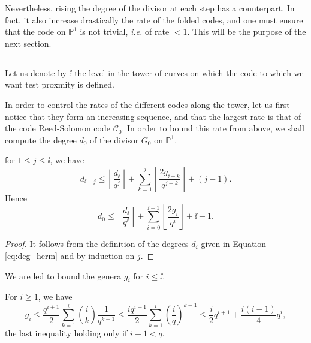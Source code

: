 \documentclass[10pt]{article}
\begin{document}
Nevertheless, rising the degree of the divisor at each step has a counterpart. In fact, it also increase drastically the rate of the folded codes, and one must ensure that the code on $\mathbb{P}^1$ is not trivial, \textit{i.e.} of rate $< 1$. This will be the purpose of the next section. \\



\subsection{}

Let us denote by $\ii$ the level in the tower of curves on which the code to which we want test proxmity is defined.


In order to control the rates of the different codes along the tower, let us first notice that they form an increasing sequence, and that the largest rate is that of the code Reed-Solomon code $\mathcal{C}_0$. In order to bound this rate from above, we shall compute the degree $d_0$ of the divisor $G_0$ on $\mathbb{P}^1$. \\

\begin{lemma}\label{lem:deg_herm}
for $1 \leq j \leq \ii$, we have 
\[d_{\ii -j} \leq \left\lfloor \dfrac{d_{\ii}}{q^j}\right\rfloor + \sum\limits_{k=1}^j \left\lfloor \dfrac{2g_{\ii -k}}{q^{j-k}}\right\rfloor + (j-1).\]
Hence 
\[d_0 \leq \left\lfloor \dfrac{d_{\ii}}{q^{\ii}}\right\rfloor + \sum\limits_{i=0}^{\ii-1} \left\lfloor \dfrac{2g_i}{q^{i}}\right\rfloor + \ii-1.\]

\end{lemma}

\begin{proof}
It follows from the definition of the degrees $d_i$ given in Equation \eqref{eq:deg_herm} and by induction on $j$.
\end{proof}

We are led to bound the genera $g_i$ for $i \leq \ii$. 

\begin{proposition}\label{prop:maj_genus_herm}
For $i \geq 1$, we have
\[g_i \leq \dfrac{q^{i+1}}{2} \sum\limits_{k=1}^i \binom{i}{k} \dfrac{1}{q^{k-1}} \leq \dfrac{iq^{i+1}}{2} \sum\limits_{k=1}^i \left(\dfrac{i}{q}\right)^{k-1} \leq \dfrac{i}{2}q^{i+1} + \dfrac{i(i-1)}{4}q^i,\]
the last inequality holding only if $i-1 < q$.
\end{proposition}
\end{document}
